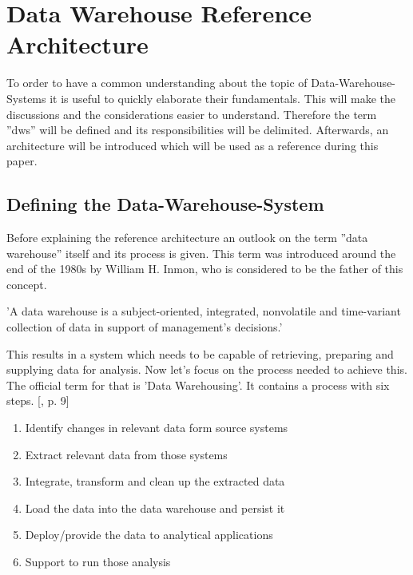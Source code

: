 \section{Data Warehouse Reference Architecture}
\label{sec:referenceArchitecture}
To order to have a common understanding about the topic of Data-Warehouse-Systems it is useful to quickly elaborate their fundamentals. This will make the discussions and the considerations easier to understand.\newline
Therefore the term ''\acrshort{dws}'' will be defined and its responsibilities will be delimited. Afterwards, an architecture will be introduced which will be used as a reference during this paper.

\subsection{Defining the Data-Warehouse-System}
Before explaining the reference architecture an outlook on the term ''data warehouse'' itself and its process is given.\newline
This term was introduced around the end of the 1980s by William H. Inmon, who is considered to be the father of this concept.
\begin{definition}
'A data warehouse is a subject-oriented, integrated, nonvolatile and time-variant collection of data in support of management's decisions.' \cite{buildingTheDWS}
\end{definition}
This results in a system which needs to be capable of retrieving, preparing and supplying data for analysis.\newline
Now let's focus on the process needed to achieve this. The official term for that is 'Data Warehousing'. It contains a process with six steps. [\cite{dwsRefArchitecture}, p. 9]
\begin{enumerate}
    \item Identify changes in relevant data form source systems
    \item Extract relevant data from those systems
    \item Integrate, transform and clean up the extracted data
    \item Load the data into the data warehouse and persist it
    \item Deploy/provide the data to analytical applications 
    \item Support to run those analysis
\end{enumerate}

